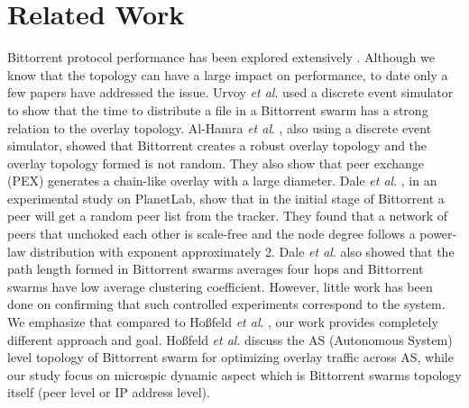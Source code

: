 \documentclass[paper]{ieice}
\begin{document}
\section{Related Work}\label{relatedworks}
Bittorrent protocol performance has been explored extensively \cite{guo2005measurements}\cite{legout2006rarest}\cite{pouwelse2004measurement}\cite{tian2007modeling}\cite{li2010measurement}\cite{zhang2010bittorrent}.  
Although we know that the topology can have a large impact on performance, to date only a few papers have addressed the issue.
Urvoy \textit{et al}. \cite{urvoy2007impact} used a discrete event simulator to show that the time to distribute a file in a Bittorrent swarm has a strong relation to the overlay topology.  
Al-Hamra \textit{et al}. \cite{al2007understanding}, also using a discrete event simulator, showed that Bittorrent creates a robust overlay topology and the overlay topology formed is not random. 
They also show that peer exchange (PEX) generates a chain-like overlay with a large diameter. 
Dale \textit{et al}. \cite{dale2008evolution}, in an experimental study on PlanetLab, show that in the initial stage of Bittorrent a peer will get a random peer list from the tracker. 
They found that a network of peers that unchoked each other is scale-free and the node degree follows a power-law distribution with exponent approximately 2. 
Dale \textit{et al}. \cite{dale2008evolution} also showed that the path length formed in Bittorrent swarms averages four hops and Bittorrent swarms have low average clustering coefficient.  
However, little work has been done on confirming that such controlled experiments correspond to the system. %
We emphasize that compared to Ho\ss{}feld \textit{et al}. \cite{TR464}, our work provides completely different approach and goal.
Ho\ss{}feld \textit{et al}. \cite{TR464} discuss the AS (Autonomous System) level topology of Bittorrent swarm for optimizing overlay traffic across AS, while our study focus on microspic dynamic aspect which is Bittorrent swarms topology itself (peer level or IP address level). 
\end{document}
